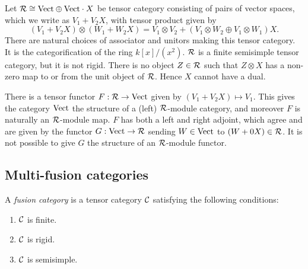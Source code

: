 \documentclass{amsart}
\begin{document}
\begin{example}
	Let $\mathcal R \cong \mathrm{Vect} \oplus \mathrm{Vect} \cdot X$ be tensor category consisting of pairs of vector spaces, which we write as $V_1 + V_2 X$, with tensor product given by 
	\begin{equation*}
		(V_1 + V_2 X) \otimes (W_1 + W_2 X) = V_1 \otimes V_2  +  (V_1 \otimes W_2 \oplus V_1 \otimes W_1)X.
	\end{equation*} 
	There are natural choices of associator and unitors making this tensor category. It is the categorification of the ring $k[x]/(x^2)$. $\mathcal R$ is a finite semisimple tensor category, but it is not rigid. There is no object $Z \in \mathcal R$ such that $Z \otimes X$ has a non-zero map to or from the unit object of $\mathcal R$. Hence $X$ cannot have a dual. 
	
	There is a tensor functor $F:\mathcal R \to \mathrm{Vect}$ given by $(V_1 + V_2 X) \mapsto V_1$. This gives the category $\mathrm{Vect}$ the structure of a (left) $\mathcal R$-module category, and moreover $F$ is naturally an $\mathcal R$-module map. $F$ has both a left and right adjoint, which agree and are given by the functor $G: \mathrm{Vect} \to \mathcal R$ sending $W \in \mathrm{Vect}$ to $(W + 0 X) \in \mathcal R$. It is not possible to give $G$ the structure of an $\mathcal R$-module functor. 
\end{example}

\subsection{Multi-fusion categories} \label{sec-tc-fusion}



\begin{definition}
A \emph{fusion category} is a tensor category $\mathcal C$ satisfying the following conditions:
\begin{enumerate}
\item $\mathcal C$ is finite. %
\item $\mathcal C$ is rigid. 
\item $\mathcal C$ is semisimple. 
\end{enumerate}
\end{definition}
\end{document}
